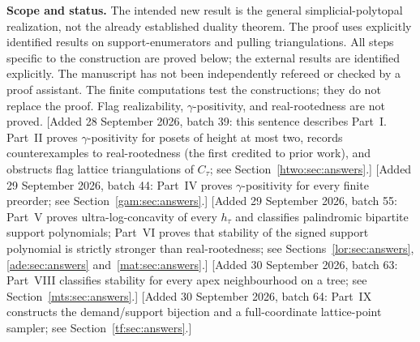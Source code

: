 \documentclass[11pt]{article}
\numberwithin{equation}{section}
\theoremstyle{definition}
\begin{document}
\begin{tcolorbox}[colback=Pale,colframe=Accent,boxrule=0.5pt,arc=1mm,
  left=9pt,right=9pt,top=7pt,bottom=7pt]
\small\textbf{Scope and status.} The intended new result is the general
simplicial-polytopal realization, not the already established duality theorem.
The proof uses explicitly identified results on support-enumerators and pulling
triangulations. All steps specific to the construction are proved below; the external results
are identified explicitly. The manuscript has not been independently refereed
or checked by a proof assistant. The finite
computations test the constructions; they do not replace the proof. Flag
realizability, $\gamma$-positivity, and real-rootedness are not proved.
[Added 28 September 2026, batch 39: this sentence describes Part~I. Part~II
proves $\gamma$-positivity for posets of height at most two, records
counterexamples to real-rootedness (the first credited to prior work), and
obstructs flag lattice triangulations of $C_\tau$; see
Section~\ref{htwo:sec:answers}.]
[Added 29 September 2026, batch 44: Part~IV proves $\gamma$-positivity for
every finite preorder; see Section~\ref{gam:sec:answers}.]
[Added 29 September 2026, batch 55: Part~V proves ultra-log-concavity of
every $h_\tau$ and classifies palindromic bipartite support polynomials;
Part~VI proves that stability of the signed support polynomial is strictly
stronger than real-rootedness; see Sections~\ref{lor:sec:answers},
\ref{ade:sec:answers} and~\ref{mat:sec:answers}.]
[Added 30 September 2026, batch 63: Part~VIII classifies stability for
every apex neighbourhood on a tree; see Section~\ref{mts:sec:answers}.]
[Added 30 September 2026, batch 64: Part~IX constructs the
demand/support bijection and a full-coordinate lattice-point sampler; see
Section~\ref{tf:sec:answers}.]
\end{tcolorbox}
\tableofcontents
\vspace{8pt}
\end{document}
